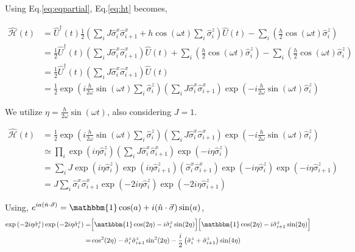 \documentclass[a4paper,11pt]{article}
\begin{document}
Using Eq.\eqref{eq:eqpartial}, Eq.\eqref{eq:ht} becomes,


\begin{align*}
\hat{\mathcal{H}}(t) & =\hat{U}^{\dagger}(t) \frac{1}{2}\left(\sum_{i} J \hat{\sigma}_{i}^{x} \hat{\sigma}_{i+1}^{x}+h \cos (\omega t) \sum_{i} \hat{\sigma}_{i}^{z}\right) \hat{U}(t)-\sum_{i}\left(\frac{h}{2} \cos (\omega t) \hat{\sigma}_{i}^{z}\right) \nonumber\\
& =\frac{1}{2} \hat{U}^{\dagger}(t)\left(\sum_{i} J \hat{\sigma}_{i}^{x} \hat{\sigma}_{i+1}^{x}\right) \hat{U}(t)+\sum_{i}\left(\frac{h}{2} \cos (\omega t) \hat{\sigma}_{i}^{z}\right)-\sum_{i}\left(\frac{h}{2} \cos (\omega t) \hat{\sigma}_{i}^{z}\right) \nonumber\\
& =\frac{1}{2} \hat{U}^{\dagger}(t)\left(\sum_{i} J \hat{\sigma}_{i}^{x} \hat{\sigma}_{i+1}^{x}\right) \hat{U}(t) \nonumber\\
& =\frac{1}{2} \exp \left(i \frac{h}{2 \omega} \sin (\omega t) \sum_{i} \hat{\sigma}_{i}^{z}\right)\left(\sum_{i} J \hat{\sigma}_{i}^{x} \hat{\sigma}_{i+1}^{x}\right) \exp \left(-i \frac{h}{2 \omega} \sin (\omega t) \hat{\sigma}_{i}^{z}\right)\nonumber
\end{align*}

We utilize $\eta=\frac{h}{2 \omega} \sin (\omega t)$, also considering $J=1$.


\begin{align}
\hat{\mathcal{H}}(t) & =\frac{1}{2} \exp \left(i \frac{h}{2 \omega} \sin (\omega t) \sum_{i} \hat{\sigma}_{i}^{z}\right)\left(\sum_{i} J \hat{\sigma}_{i}^{x} \hat{\sigma}_{i+1}^{x}\right) \exp \left(-i \frac{h}{2 \omega} \sin (\omega t) \hat{\sigma}_{i}^{z}\right) \nonumber\\
& \simeq \prod_i \exp\left(i\eta\hat{\sigma}^z_i\right)\left(\sum_{i} J \hat{\sigma}_{i}^{x} \hat{\sigma}_{i+1}^{x}\right)\exp\left(-i\eta\hat{\sigma}^z_i\right)\nonumber\\
&= \sum_i J \exp(i\eta\hat{\sigma}^z_i)\exp(i\eta\hat{\sigma}^z_{i+1})\left( \hat{\sigma}_{i}^{x} \hat{\sigma}_{i+1}^{x}\right)\exp(-i\eta\hat{\sigma}^z_i)\exp(-i\eta\hat{\sigma}^z_{i+1})\nonumber\\
&= J\sum_{i} \hat{\sigma}_{i}^{x} \hat{\sigma}_{i+1}^{x}\exp(-2i\eta\hat{\sigma}^z_i)\exp(-2i\eta\hat{\sigma}^z_{i+1})
\label{eq:hmov}
\end{align}

Using, $\displaystyle e^{ia(\hat{n}\cdot \vec{\sigma})} = \mathbbm{1} \cos(a) + i (\hat{n}\cdot \vec{\sigma})\sin(a)$, 
\begin{align}
\exp\left(-2i\eta\hat{\sigma}^z_i\right)\exp\left(-2i\eta\hat{\sigma}^z_i\right)
=& \Big[\mathbbm{1} \cos(2\eta) - i \hat{\sigma}^z_i\sin(2\eta)\Big]\Big[\mathbbm{1} \cos(2\eta) - i \hat{\sigma}^z_{i+1}\sin(2\eta)\Big]\nonumber\\
=& \cos^2(2\eta) - \hat{\sigma}^z_i\hat{\sigma}^z_{i+1}\sin^2(2\eta) -\frac{i}{2} \left(\hat{\sigma}^z_i+ \hat{\sigma}^z_{i+1}\right)\sin(4\eta)
\label{eq:op}
\end{align}
\end{document}
